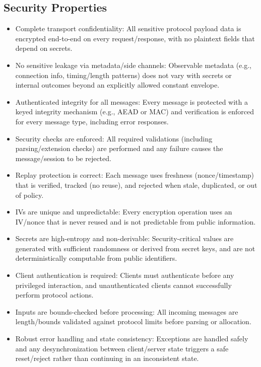 \documentclass{article}
\theoremstyle{plain}
\theoremstyle{definition}
\theoremstyle{remark}
\begin{document}
\subsection{Security Properties}
\begin{itemize}
  \item Complete transport confidentiality: All sensitive protocol payload data is encrypted end-to-end on every request/response, with no plaintext fields that depend on secrets.
  \item No sensitive leakage via metadata/side channels: Observable metadata (e.g., connection info, timing/length patterns) does not vary with secrets or internal outcomes beyond an explicitly allowed constant envelope.
  \item Authenticated integrity for all messages: Every message is protected with a keyed integrity mechanism (e.g., AEAD or MAC) and verification is enforced for every message type, including error responses.
  \item Security checks are enforced: All required validations (including parsing/extension checks) are performed and any failure causes the message/session to be rejected.
  \item Replay protection is correct: Each message uses freshness (nonce/timestamp) that is verified, tracked (no reuse), and rejected when stale, duplicated, or out of policy.
  \item IVs are unique and unpredictable: Every encryption operation uses an IV/nonce that is never reused and is not predictable from public information.
  \item Secrets are high-entropy and non-derivable: Security-critical values are generated with sufficient randomness or derived from secret keys, and are not deterministically computable from public identifiers.
  \item Client authentication is required: Clients must authenticate before any privileged interaction, and unauthenticated clients cannot successfully perform protocol actions.
  \item Inputs are bounds-checked before processing: All incoming messages are length/bounds validated against protocol limits before parsing or allocation.
  \item Robust error handling and state consistency: Exceptions are handled safely and any desynchronization between client/server state triggers a safe reset/reject rather than continuing in an inconsistent state.
\end{itemize}
\end{document}

